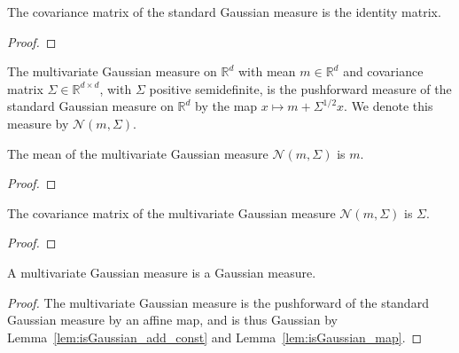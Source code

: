 \begin{lemma}\label{lem:covMatrix_stdGaussian}
The covariance matrix of the standard Gaussian measure is the identity matrix.
\end{lemma}

\begin{proof}

\end{proof}


\begin{definition}\label{def:multivariateGaussian}
  \leanok
The multivariate Gaussian measure on $\mathbb{R}^d$ with mean $m \in \mathbb{R}^d$ and covariance matrix $\Sigma \in \mathbb{R}^{d \times d}$, with $\Sigma$ positive semidefinite, is the pushforward measure of the standard Gaussian measure on $\mathbb{R}^d$ by the map $x \mapsto m + \Sigma^{1/2} x$.
We denote this measure by $\mathcal{N}(m, \Sigma)$.
\end{definition}


\begin{lemma}\label{lem:integral_id_multivariateGaussian}
The mean of the multivariate Gaussian measure $\mathcal{N}(m, \Sigma)$ is $m$.
\end{lemma}

\begin{proof}

\end{proof}


\begin{lemma}\label{lem:covMatrix_multivariateGaussian}
The covariance matrix of the multivariate Gaussian measure $\mathcal{N}(m, \Sigma)$ is $\Sigma$.
\end{lemma}

\begin{proof}

\end{proof}


\begin{lemma}\label{lem:isGaussian_multivariateGaussian}
  \leanok
A multivariate Gaussian measure is a Gaussian measure.
\end{lemma}

\begin{proof}
The multivariate Gaussian measure is the pushforward of the standard Gaussian measure by an affine map, and is thus Gaussian by Lemma~\ref{lem:isGaussian_add_const} and Lemma~\ref{lem:isGaussian_map}.
\end{proof}


